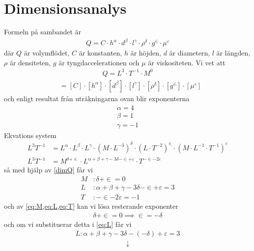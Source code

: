 \documentclass[a4paper,12pt]{article}
\begin{document}
\section{Dimensionsanalys}
Formeln på sambandet är
\begin{align}
    Q = C \cdot h^\alpha \cdot d^\beta \cdot l^\gamma \cdot \rho^\delta \cdot g^\in \cdot \mu^\varepsilon
\end{align}
där $Q$ är volymflödet, $C$ är konstanten, $h$ är höjden, $d$ är diametern, $l$ är längden, $\rho$ är densiteten, $g$ är tyngdaccelerationen och $\mu$ är viskositeten. Vi vet att
\begin{align}\label{dimQ}
    Q = L^3 \cdot T^{-1} \cdot M^0
\end{align}
\begin{align}
    [Q] &= [C] \cdot [h^\alpha] \cdot [d^\beta] \cdot [l^\gamma] \cdot [\rho^\delta] \cdot [g^\in] \cdot [\mu^\varepsilon]
\end{align}
och enligt resultat från uträkningarna ovan blir exponenterna
%
\begin{align}
    \alpha = 4 \\
    \beta = 1 \\
    \gamma = -1
\end{align}
%
Ekvations system
\begin{align}
    L^3T^{-1} &= L^{\alpha} \cdot L^{\beta} \cdot L^{\gamma} \cdot (M \cdot L^{-3})^{\delta} \cdot (L \cdot T^{-2})^{\in} \cdot (M \cdot L^{-1} \cdot T^{-1})^{\varepsilon} \\
    L^3T^{-1} &= M^{\delta + \in} \cdot L^{\alpha + \beta + \gamma - 3\delta - \in + \varepsilon} \cdot T^{-\in - 2\varepsilon}
\end{align}
så med hjälp av \ref{dimQ} får vi
\begin{align}
    M&: \delta + \in = 0 \label{eq:M}\\
    L&: \alpha + \beta + \gamma - 3\delta - \in + \varepsilon = 3 \label{eq:L}\\
    T&: -\in - 2\varepsilon = -1 \label{eq:T}
\end{align}
och av \cref{eq:M,eq:L,eq:T} kan vi lösa resterande exponenter
\begin{align}
    \delta + \in = 0 \implies \in = - \delta
\end{align}
och om vi substituerar detta i \cref{eq:L} får vi
\begin{align}
    L: \alpha + \beta + \gamma - 3\delta - (-\delta) + \varepsilon = 3
\end{align}
\begin{align*}
    \downarrow
\end{align*}
\end{document}
